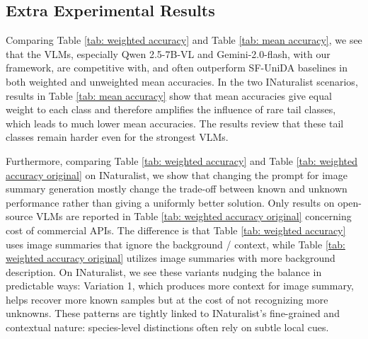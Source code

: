 \documentclass[10pt]{article} %
\begin{document}
\subsection{Extra Experimental Results} \label{apx: experimental results}
Comparing Table \ref{tab: weighted accuracy} and Table \ref{tab: mean accuracy}, we see that the VLMs, especially Qwen 2.5-7B-VL and Gemini-2.0-flash, with our framework,  are competitive with, and often outperform SF-UniDA baselines in both weighted and unweighted mean accuracies. In the two INaturalist scenarios, results in Table \ref{tab: mean accuracy} show that mean accuracies give equal weight to each class and therefore amplifies the influence of rare tail classes, which leads to much lower mean accuracies. The results review that these tail classes remain harder even for the strongest VLMs. 

Furthermore, comparing Table \ref{tab: weighted accuracy} and Table \ref{tab: weighted accuracy original} on INaturalist, we show that changing the prompt for image summary generation mostly change the trade-off between known and unknown performance rather than giving a uniformly better solution. Only results on open-source VLMs are reported in Table \ref{tab: weighted accuracy original} concerning cost of commercial APIs. The difference is that Table \ref{tab: weighted accuracy} uses image summaries that ignore the background / context, while Table \ref{tab: weighted accuracy original} utilizes image summaries with more background description. On INaturalist, we see these variants nudging the balance in predictable ways: Variation 1, which produces more context for image summary, helps recover more known samples but at the cost of not recognizing more unknowns. These patterns are tightly linked to INaturalist’s fine-grained and contextual nature: species-level distinctions often rely on subtle local cues.
\end{document}
